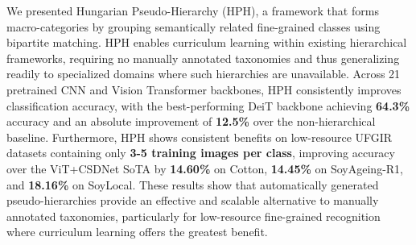 \documentclass[conference,a4paper]{IEEEtran}
\begin{document}
We presented Hungarian Pseudo-Hierarchy (HPH), a framework that forms macro-categories by grouping semantically related fine-grained classes using bipartite matching. HPH enables curriculum learning within existing hierarchical frameworks, requiring no manually annotated taxonomies and thus generalizing readily to specialized domains where such hierarchies are unavailable. Across 21 pretrained CNN and Vision Transformer backbones, HPH consistently improves classification accuracy, with the best-performing DeiT backbone achieving \textbf{64.3\%} accuracy and an absolute improvement of \textbf{12.5\%} over the non-hierarchical baseline. Furthermore, HPH shows consistent benefits on low-resource UFGIR datasets containing only \textbf{3-5 training images per class}, improving accuracy over the ViT+CSDNet SoTA by \textbf{14.60\%} on Cotton, \textbf{14.45\%} on SoyAgeing-R1, and \textbf{18.16\%} on SoyLocal. These results show that automatically generated pseudo-hierarchies provide an effective and scalable alternative to manually annotated taxonomies, particularly for low-resource fine-grained recognition where curriculum learning offers the greatest benefit.



\end{document}
